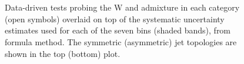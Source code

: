 \begin{figure}[h!]
  \begin{center}
     \\
    ~~
    \caption{Data-driven tests probing the W and \ttbar admixture 
      in each \njet category (open symbols) overlaid on top of the systematic
      uncertainty estimates used for each of the seven \scalht bins
      (shaded bands), from formula method.
      The symmetric (asymmetric) jet topologies are shown in the top (bottom) plot.      
    }
    \label{fig:closureBTag-formula}
  \end{center} 
\end{figure}

